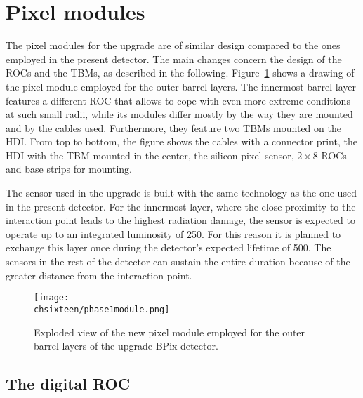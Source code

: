 \section{Pixel modules}

The pixel modules for the upgrade are of similar design compared to the ones employed in the present detector. The main changes concern the design of the ROCs and the TBMs, as described in the following.
Figure~\ref{fig:Phase1Mod} shows a drawing of the pixel module employed for the outer barrel layers.
The innermost barrel layer features a different ROC that allows to cope with even more extreme conditions at such small radii, while its modules differ mostly by the way they are mounted and by the cables used. Furthermore, they feature two TBMs mounted on the HDI.
From top to bottom, the figure shows the cables with a connector print, the HDI with the TBM mounted in the center, the silicon pixel sensor, $2\times8$ ROCs and base strips for mounting.

The sensor used in the upgrade is built with the same technology as the one used in the present detector. For the innermost layer, where the close proximity to the interaction point leads to the highest radiation damage, the sensor is expected to operate up to an integrated luminosity of 250\fbinv. For this reason it is planned to exchange this layer once during the detector's expected lifetime of 500\fbinv. The sensors in the rest of the detector can sustain the entire duration because of the greater distance from the interaction point.

\begin{figure}[!htb]
 \begin{center}
 \texttt{[image: \\chsixteen/phase1module.png]}
 \end{center}
 \caption{Exploded view of the new pixel module employed for the outer barrel layers of the upgrade BPix detector.}
 \label{fig:Phase1Mod}
\end{figure}

\subsection{The digital ROC}

